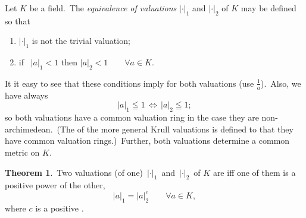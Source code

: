 \documentclass[12pt]{article}
\theoremstyle{definition}
\newtheorem*{thmplain}{Theorem}
\begin{document}
Let $K$ be a field. \,The {\em equivalence of valuations} $|\cdot|_1$ and  $|\cdot|_2$ of $K$ may be defined so that
\begin{enumerate}
\item $|\cdot|_1$ is not the trivial valuation;
\item if \, $|a|_1 < 1$ then $|a|_2 < 1 \qquad \forall a \in K.$
\end{enumerate}

It it easy to see that these conditions imply  for both valuations (use $\frac{1}{a}$). \,Also, we have always
     $$|a|_1 \leqq 1 \, \Leftrightarrow \, |a|_2 \leqq 1;$$
so both valuations have a common valuation ring in the case they are non-archimedean. \,(The  of the more general Krull valuations is defined to  that they have common valuation rings.) \,Further, both valuations determine a common metric on $K$. 

\begin{thmplain}
\,Two valuations (of  one)  \,$|\cdot|_1$\, and \,$|\cdot|_2$\, of $K$ are  iff one of them is a positive power of the other,
       $$|a|_1 = |a|_2^c \qquad \forall a \in K,$$
where $c$ is a positive .
\end{thmplain}
\end{document}
